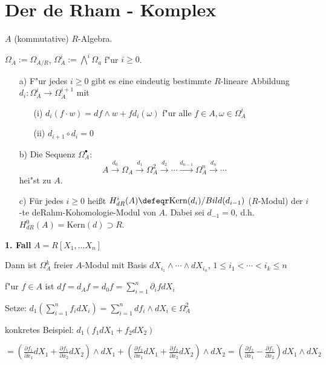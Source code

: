 \section{Der de Rham - Komplex}

$A$ (kommutative) $R$-Algebra.

$\Omega_A := \Omega_{A/R}$, $\Omega^i_A := \bigwedge\nolimits^i\Omega_a$ f"ur $i \geq 0$.

\begin{SatzDef}
\begin{enumerate}
\item[a)] F"ur jedes $i \geq 0$ gibt es eine eindeutig bestimmte $R$-lineare Abbildung $d_i : \Omega^i_A \rightarrow \Omega^{i+1}_A$ mit
\begin{enumerate}
\item[(i)] $d_i(f \cdot w) = df \wedge w + f d_i(\omega)$ f"ur alle $f \in A, \omega \in \Omega^i_A$
\item[(ii)] $d_{i+1} \circ d_i = 0$
\end{enumerate}

\item[b)]
Die Sequenz $\Omega^\bullet_A$:
$$A \overset{d_0}{\rightarrow} \Omega_A \overset{d_1}{\rightarrow} \Omega^2_A \overset{d_2}{\rightarrow} \cdots \overset{d_{n-1}}{\rightarrow} \Omega^n_A  \overset{d_n}{\rightarrow} \cdots$$
hei"st  zu $A$.

\item[c)]
F\"ur jedes $i\geq 0$ hei\ss t $H_{dR}^i(A)\defeqr \textrm{Kern}(d_i)/Bild(d_{i-1})$ ($R$-Modul)
der $i$-te deRahm-Kohomologie-Modul von $A$. Dabei sei $d_{-1}=0$, d.h. $H_{dR}^0(A)=\textrm{Kern}(d)\supset R$.

\end{enumerate}

\begin{Bew}
\textbf{1. Fall} $A = R[X_1, \ldots X_n]$

Dann ist $\Omega^k_A$ freier $A$-Modul mit Basis $d X_{i_1} \wedge \cdots \wedge d X_{i_n}$, $1 \leq i_1 < \cdots < i_k \leq n$

f"ur $f \in A$ ist $df = d_A f = d_0 f = \sum_{i=1}^n \partial_i f d X_i$

Setze: $d_1(\sum_{i=1}^n f_i d X_i) = \sum_{i=1}^n d f_i \wedge d X_i \in \Omega^2_A$

konkretes Beispiel: $d_1(f_1 dX_1 + f_2 dX_2)$

$= (\frac{\partial f_1}{\partial x_1} dX_1 + \frac{\partial f_1}{\partial x_2} dX_2) \wedge dX_1 + (\frac{\partial f_2}{\partial x_1} dX_1 + \frac{\partial f_2}{\partial x_2} dX_2) \wedge dX_2 = (\frac{\partial f_2}{\partial x_1} - \frac{\partial f_1}{\partial x_2}) dX_1 \wedge dX_2$


\end{Bew}
\end{SatzDef}

